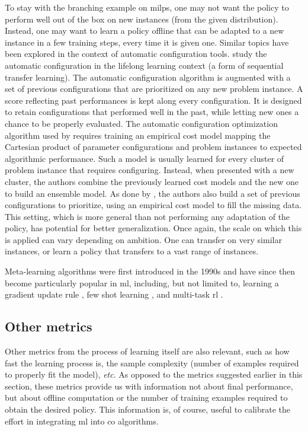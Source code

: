 \documentclass[11pt]{article}
\begin{document}
		To stay with the branching example on \glspl{milp}, one may not want the policy to perform well out
		of the box on new instances (from the given distribution).
		Instead, one may want to learn a policy offline that can be adapted to a new instance in a few
		training steps, every time it is given one.
		Similar topics have been explored in the context of automatic configuration tools.
		\cite{FitzgeraldReact2014} study the automatic configuration in the lifelong learning
		context (a form of sequential transfer learning).
		The automatic configuration algorithm is augmented with a set of previous configurations that are
		prioritized on any new problem instance.
		A score reflecting past performances is kept along every configuration.
		It is designed to retain configurations that performed well in the past, while letting
		new ones a chance to be properly evaluated.
		The automatic configuration optimization algorithm used by \cite{LindauerWarmstarting2018} requires
		training an empirical cost model mapping the Cartesian product of parameter configurations and
		problem instances to expected algorithmic performance.
		Such a model is usually learned for every cluster of problem instance that requires configuring.
		Instead, when presented with a new cluster, the authors combine the previously learned cost models
		and the new one to build an ensemble model.
		As done by \cite{FitzgeraldReact2014}, the authors also build a set of previous configurations to
		prioritize, using an empirical cost model to fill the missing data.
		This setting, which is more general than not performing any adaptation of the policy, has potential
		for better generalization.
		Once again, the scale on which this is applied can vary depending on ambition.
		One can transfer on very similar instances, or learn a policy that transfers to a vast range of
		instances.

		Meta-learning algorithms were first introduced in the 1990s \citep{BengioLearningSynaptic1991,
		SchmidhuberLearningControl1992, ThrunPrattBook1998} and have since then become particularly popular
		in \gls{ml}, including, but not limited to, learning a gradient update rule
		\citep{HochreiterLearningLearn2001, AndrychowiczLearninglearngradient2016}, few shot learning
		\citep{RaviOptimizationFewShot2017}, and multi-task \gls{rl}
		\citep{FinnModelAgnosticMetaLearningFast2017}.

	\subsection{Other metrics}
		Other metrics from the process of learning itself are also relevant, such as how fast the learning
		process is, the sample complexity (number of examples required to properly fit the model),
		\textit{etc}.
		As opposed to the metrics suggested earlier in this section, these metrics provide us with
		information not about final performance, but about offline computation or the number of training
		examples required to obtain the desired policy.
		This information is, of course, useful to calibrate the effort in integrating \gls{ml} into
		\gls{co} algorithms.
\end{document}
